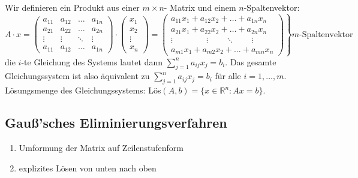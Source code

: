 \documentclass[12pt,a4paper]{article}
\theoremstyle{plain}
\newcommand{\R}{\mathbb{R}}
\numberwithin{equation}{section}
\begin{document}
Wir definieren ein Produkt aus einer $m\times n$- Matrix und einem $n$-Spaltenvektor:\[
A\cdot x =\left. \left(\begin{matrix}
a_{11} & a_{12} & \ldots & a_{1n} \\
a_{21} & a_{22} & \ldots & a_{2n} \\
\vdots & \vdots & \ddots & \vdots \\
a_{11} & a_{12} & \ldots & a_{1n} 
\end{matrix} \right) \cdot \left(\begin{array}{c}x_1\\ x_2\\  \vdots\\x_n\end{array}\right) = \left(\begin{matrix}
a_{11}x_1+a_{12}x_2+\ldots+a_{1n}x_n  \\ 
a_{21}x_1+a_{22}x_2+\ldots+a_{2n}x_n \\ 
\vdots\qquad \qquad \vdots \qquad \ddots \qquad  \vdots\\ 
a_{m1}x_1+a_{m2}x_2+\ldots+a_{mn}x_n \end{matrix} \right) \right\rbrace m\text{-Spaltenvektor} 
\]
die $i$-te Gleichung des Systems lautet dann $\sum_{j=1}^n{a_{ij}x_j}=b_i$. Das gesamte Gleichungssystem ist also äquivalent zu $\sum_{j=1}^n{a_{ij}x_j}=b_i$ für alle $i=1,\ldots,m$. \\
Lösungsmenge des Gleichungssystems: Lös$(A,b)=\{x\in\R^n: Ax=b\}$.
\subsection{Gauß'sches Eliminierungsverfahren}
\begin{enumerate}
\item Umformung der Matrix auf Zeilenstufenform
\item explizites Lösen \glqq von unten nach oben\grqq
\end{enumerate}
\end{document}
